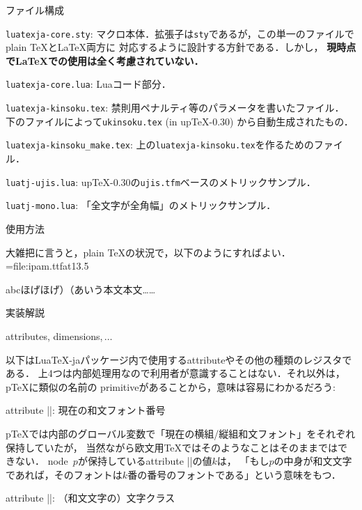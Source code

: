 \beginparagraph ファイル構成


\item {\tt luatexja-core.sty}: 
マクロ本体．拡張子は{\tt sty}であるが，この単一のファイルでplain \TeX と\LaTeX 両方に
対応するように設計する方針である．しかし，
{\bf 現時点で\LaTeX での使用は全く考慮されていない．}
\item {\tt luatexja-core.lua}: Luaコード部分．
\item {\tt luatexja-kinsoku.tex}: 禁則用ペナルティ等のパラメータを書いたファイル．
下のファイルによって{\tt ukinsoku.tex} (in up\TeX-0.30) から自動生成されたもの．
\item {\tt luatexja-kinsoku\_make.tex}: 上の{\tt luatexja-kinsoku.tex}を作るためのファイル．
\item {\tt luatj-ujis.lua}: up\TeX-0.30の{\tt ujis.tfm}ベースのメトリックサンプル．
\item {\tt luatj-mono.lua}: 「全文字が全角幅」のメトリックサンプル．
\enditem

\beginsection 使用方法

大雑把に言うと，plain \TeX の状況で，以下のようにすればよい．
\begintt
\font\tenipam={file:ipam.ttf}at13.5\jQ 
\jfont{}                     %
\tenipam{}\zw 
{}                 %

\rm abcほげほげ）（あいう本文本文……
\endtt

\beginsection 実装解説

\beginparagraph attributes, dimensions,$\,\ldots$

以下はLua\TeX-jaパッケージ内で使用するattributeやその他の種類のレジスタである．
上4つは内部処理用なので利用者が意識することはない．それ以外は，p\TeX に類似の名前の
primitiveがあることから，意味は容易にわかるだろう:

\item attribute |\luatexja@curjfnt|: 現在の和文フォント番号

p\TeX では内部のグローバル変数で「現在の横組/縦組和文フォント」をそれぞれ保持していたが，
当然ながら欧文用\TeX ではそのようなことはそのままではできない．
node~$p$が保持しているattribute |\luatexja@curjfn|の値$k$は，
「もし$p$の中身が和文文字であれば，そのフォントは$k$番の番号のフォントである」という意味をもつ．

\item attribute |\luatexja@charclass|: （和文文字の）文字クラス

